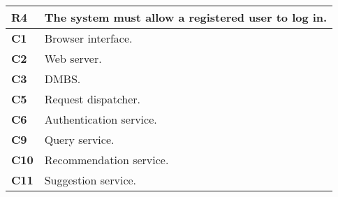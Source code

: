 \begin{table}[H]
    \centering
    \begin{tabular}{|l|m{10cm}|}
        \hline \textbf{R4} & The system must allow a registered user to log in. \\
        \hline \textbf{C1} & Browser interface. \\
        \hline \textbf{C2} & Web server. \\
        \hline \textbf{C3} & DMBS. \\
        \hline \textbf{C5} & Request dispatcher. \\
        \hline \textbf{C6} & Authentication service. \\
        \hline \textbf{C9} & Query service. \\
        \hline \textbf{C10} & Recommendation service. \\
        \hline \textbf{C11} & Suggestion service. \\
        \hline
    \end{tabular}
\end{table}


